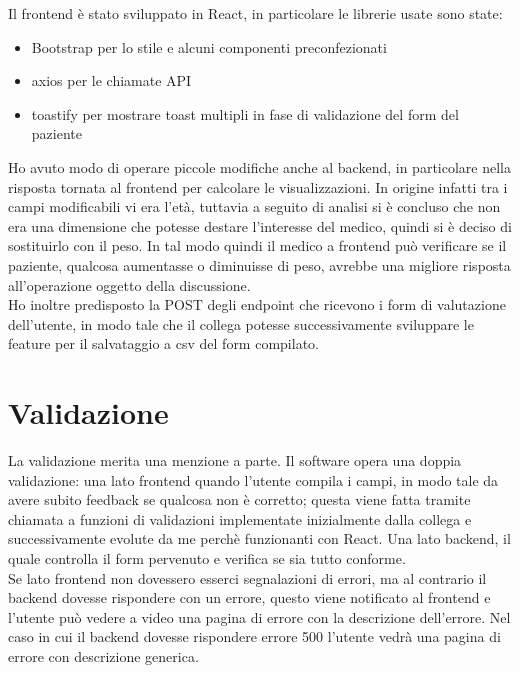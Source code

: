 Il frontend è stato sviluppato in React, in particolare le librerie usate sono state:
\begin{itemize}
    \item Bootstrap per lo stile e alcuni componenti preconfezionati
    \item axios per le chiamate API
    \item toastify per mostrare toast multipli in fase di validazione del form del paziente
\end{itemize}

Ho avuto modo di operare piccole modifiche anche al backend, in particolare nella risposta tornata al frontend per calcolare le visualizzazioni. In origine infatti tra i campi modificabili vi era l'età, tuttavia a seguito di analisi si è concluso che non era una dimensione che potesse destare l'interesse del medico, quindi si è deciso di sostituirlo con il peso. In tal modo quindi il medico a frontend può verificare se il paziente, qualcosa aumentasse o diminuisse di peso, avrebbe una migliore risposta all'operazione oggetto della discussione.\\ 
Ho inoltre predisposto la POST degli endpoint che ricevono i form di valutazione dell'utente, in modo tale che il collega potesse successivamente sviluppare le feature per il salvataggio a csv del form compilato.

\section{Validazione}
La validazione merita una menzione a parte. Il software opera una doppia validazione: una lato frontend quando l'utente compila i campi, in modo tale da avere subito feedback se qualcosa non è corretto; questa viene fatta tramite chiamata a funzioni di validazioni implementate inizialmente dalla collega e successivamente evolute da me perchè funzionanti con React. Una lato backend, il quale controlla il form pervenuto e verifica se sia tutto conforme.\\
Se lato frontend non dovessero esserci segnalazioni di errori, ma al contrario il backend dovesse rispondere con un errore, questo viene notificato al frontend e l'utente può vedere a video una pagina di errore con la descrizione dell'errore. Nel caso in cui il backend dovesse rispondere errore 500 l'utente vedrà una pagina di errore con descrizione generica. 

